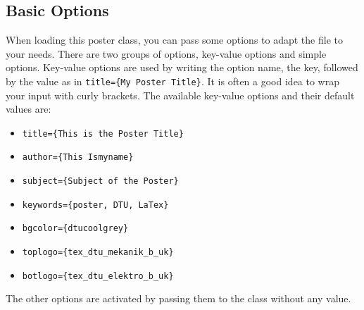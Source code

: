 \documentclass[
    ,3columns
    ,a0paper
    ,crop
]{dtuposter}
\begin{document}
\begin{dtupostercontent}
\section{Basic Options}

When loading this poster class, you can pass some options to adapt the file to your needs. 
There are two groups of options, key-value options and simple options. Key-value options are
used by writing the option name, the key, followed by the value as in \texttt{title=\{My Poster Title\}}. 
It is often a good idea to wrap your input with curly brackets. The available key-value options 
and their default values are:
\begin{itemize}
\item \texttt{title=\{This is the Poster Title\}}
\item \texttt{author=\{This Ismyname\}}
\item \texttt{subject=\{Subject of the Poster\}}
\item \texttt{keywords=\{poster, DTU, LaTex\}}
\item \texttt{bgcolor=\{dtucoolgrey\}}
\item \texttt{toplogo=\{tex\_dtu\_mekanik\_b\_uk\}}
\item \texttt{botlogo=\{tex\_dtu\_elektro\_b\_uk\}}
\end{itemize}
The other options are activated by passing them to the class without any value.


\end{dtupostercontent}
\end{document}
